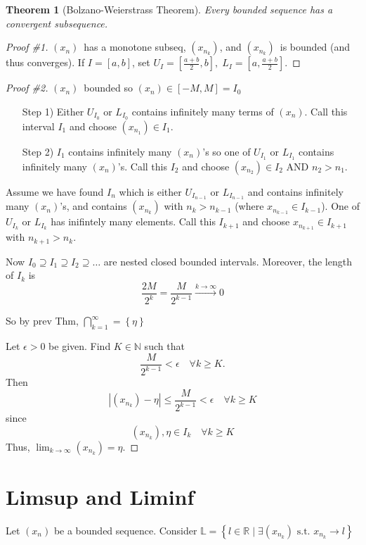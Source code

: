 \documentclass{report}
\newcommand{\N}{\mathbb{N}}  %
\newcommand{\bbR}{\mathbb{R}}  %
\newcommand{\xn}{(x_n)}
\newcommand{\xnkp}{(x_{n_k})}
\theoremstyle{mystyle}
\theoremstyle{customtheorem}
\newtheorem{customthm}{Theorem}
\begin{document}
    \begin{customthm}[Bolzano-Weierstrass Theorem]
        Every bounded sequence has a convergent subsequence.
    \end{customthm}

    \begin{proof}[Proof \#1]
        $\xn$\ has a monotone subseq, $\xnkp$, and $\xnkp$\ is bounded (and thus converges). If $I=[a,b]$, set $U_I=[\frac{a+b}{2}, b],\; L_I=[a, \frac{a+b}{2}]$.
    \end{proof}

    \begin{proof}[Proof \#2]
        $\xn$\ bounded so $\xn$$\in [-M, M]=I_0$
        \begin{enumerate}
            \item[Step 1)] Either $U_{I_0}$ or $L_{I_0}$ contains infinitely many terms of $\xn$. Call this interval $I_1$ and choose $(x_{n_1})\in I_1$.
            \item[Step 2)] $I_1$ contains infinitely many $\xn$'s so one of $U_{I_1}$ or $L_{I_1}$ contains infinitely many $\xn$'s. Call this $I_2$ and choose $(x_{n_2})\in I_2$ AND $n_2 > n_1$.
        \end{enumerate}

        Assume we have found $I_n$ which is either $U_{I_{n-1}}$ or $L_{I_{n-1}}$ and contains infinitely many $\xn$'s, and contains $\xnkp$ with $n_k > n_{k-1}$ (where $x_{n_{k-1}}\in I_{k-1}$). One of $U_{I_k}$ or $L_{I_k}$ has inifintely many elements. Call this $I_{k+1}$ and choose $x_{n_{k+1}}\in I_{k+1}$ with $n_{k+1} > n_k$.

        Now $I_0 \supseteq I_1 \supseteq I_2 \supseteq \ldots$ are nested closed bounded intervals. Moreover, the length of $I_k$ is
        \[\frac{2M}{2^k}=\frac{M}{2^{k-1}}\xrightarrow{k\rightarrow\infty}0\]

        So by prev Thm, $\bigcap^\infty_{k=1}=\left\{\eta\right\}$

        Let $\epsilon > 0$ be given. Find $K\in\N$ such that \[\frac{M}{2^{k-1}}<\epsilon\quad \forall k\geq K.\] Then
        \[ \left|\xnkp-\eta\right| \leq \frac{M}{2^{k-1}} < \epsilon \quad \forall k \geq K\]
        since \[\xnkp, \eta \in I_k \quad \forall k\geq K\]
        Thus, $\lim_{k\rightarrow\infty}\xnkp=\eta$.
    \end{proof}

    \section*{Limsup and Liminf}
    Let $\xn$ be a bounded sequence. Consider $\mathbb{L}=\left\{l\in\bbR \; \vert\; \exists \xnkp \text{ s.t. } x_{n_k}\rightarrow l\right\}$
\end{document}
